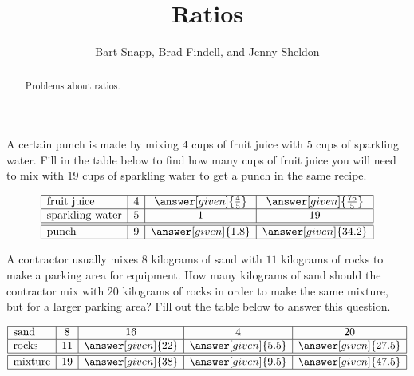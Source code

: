 \documentclass[nooutcomes]{ximera}
\title{Ratios}
\author{Bart Snapp, Brad Findell, and Jenny Sheldon}
\begin{document}
\begin{abstract}
Problems about ratios.
\end{abstract}
\maketitle








\begin{problem}
A certain punch is made by mixing $4$ cups of fruit juice with $5$ cups of sparkling water.  Fill in the table below to find how many cups of fruit juice you will need to mix with $19$ cups of sparkling water to get a punch in the same recipe.

\[
\begin{array}{|l|c|c|c|} \hline
\textrm{fruit juice} & 4 & \answer[given]{\frac{4}{5}} & \answer[given]{\frac{76}{5}} \\ \hline
\textrm{sparkling water} &5 & 1 & 19 \\ \hline \hline
\textrm{punch} & 9 & \answer[given]{1.8} & \answer[given]{34.2} \\ \hline
\end{array}
\]
\end{problem}


\begin{problem}
A contractor usually mixes $8$ kilograms of sand with $11$ kilograms of rocks to make a parking area for equipment.  How many kilograms of sand should the contractor mix with $20$ kilograms of rocks in order to make the same mixture, but for a larger parking area?  Fill out the table below to answer this question.

\[
\begin{array}{|l|c|c|c|c|} \hline
\textrm{sand} & 8 & 16 & 4 & 20 \\ \hline
\textrm{rocks} & 11 & \answer[given]{22} & \answer[given]{5.5} & \answer[given]{27.5} \\ \hline \hline
\textrm{mixture} & 19 & \answer[given]{38} & \answer[given]{9.5} & \answer[given]{47.5} \\ \hline
\end{array}
\]
\end{problem}
\end{document}
